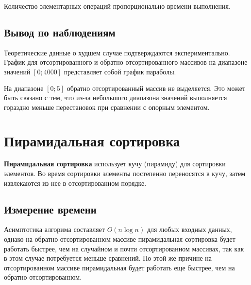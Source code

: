 \documentclass[11pt]{article}
\begin{document}
Количество элементарных операций пропорционально времени выполнения.

\subsection{Вывод по наблюдениям}

Теоретические данные о худшем случае подтверждаются экспериментально. График для отсортированного
и обратно отсортированного массивов на диапазоне значений $\left[0;4000\right]$ представляет собой график параболы.

На диапазоне $\left[0;5\right]$ обратно отсортированный массив не выделяется. Это может быть связано с тем,
что из-за небольшого диапазона значений выполняется гораздно меньше перестановок при сравнении с опорным элементом.

\newpage

\setcounter{section}{11}
\section*{\centering Пирамидальная сортировка}

\textbf{Пирамидальная сортировка} использует кучу (пирамиду) для сортировки
элементов. Во время сортировки элементы постепенно переносятся в кучу, затем извлекаются из нее в отсортированном порядке.

\setcounter{subsection}{0}
\subsection{Измерение времени}

\begin{center}
\end{center}
{ \hspace*{\fill} }

\begin{center}
\end{center}
{ \hspace*{\fill} }

Асимптотика алгорима составляет $O(n\log n)$ для любых входных данных, однако на обратно отсортированном
массиве пирамидальная сортировка будет работать быстрее, чем на случайном и почти отсортированном массивах, так как в этом случае
потребуется меньше сравнений. По этой же причине на отсортированном массиве пирамидальная будет работать еще быстрее, чем на
обратно отсортированном.
\end{document}
